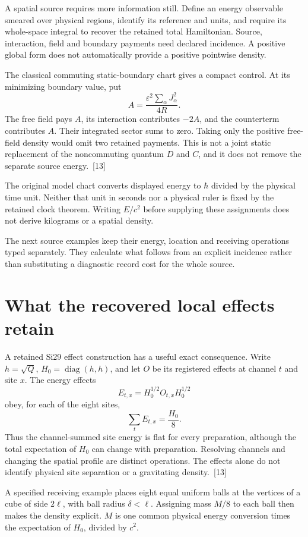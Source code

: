 \documentclass[10pt,twocolumn,letterpaper]{article}
\begin{document}
A spatial source requires more information still. Define an energy observable smeared over physical regions, identify its reference and units, and require its whole-space integral to recover the retained total Hamiltonian. Source, interaction, field and boundary payments need declared incidence. A positive global form does not automatically provide a positive pointwise density.

The classical commuting static-boundary chart gives a compact control. At its minimizing boundary value, put
\[
A=\frac{\varepsilon^2\sum_{\alpha}J_{\alpha}^2}{4R}.
\]
The free field pays $A$, its interaction contributes $-2A$, and the counterterm contributes $A$. Their integrated sector sums to zero. Taking only the positive free-field density would omit two retained payments. This is not a joint static replacement of the noncommuting quantum $D$ and $C$, and it does not remove the separate source energy.~[13]

The original model chart converts displayed energy to $\hbar$ divided by the physical time unit. Neither that unit in seconds nor a physical ruler is fixed by the retained clock theorem. Writing $E/c^2$ before supplying these assignments does not derive kilograms or a spatial density.

The next source examples keep their energy, location and receiving operations typed separately. They calculate what follows from an explicit incidence rather than substituting a diagnostic record cost for the whole source.

\section{What the recovered local effects retain}
A retained Si29 effect construction has a useful exact consequence. Write $h=\sqrt{Q}$, $H_0=\operatorname{diag}(h,h)$, and let $O$ be its registered effects at channel $t$ and site $x$. The energy effects
\[
E_{t,x}=H_0^{1/2}O_{t,x}H_0^{1/2}
\]
obey, for each of the eight sites,
\[
\sum_t E_{t,x}=\frac{H_0}{8}.
\]
Thus the channel-summed site energy is flat for every preparation, although the total expectation of $H_0$ can change with preparation. Resolving channels and changing the spatial profile are distinct operations. The effects alone do not identify physical site separation or a gravitating density.~[13]

A specified receiving example places eight equal uniform balls at the vertices of a cube of side $2\ell$, with ball radius $\delta<\ell$. Assigning mass $M/8$ to each ball then makes the density explicit. $M$ is one common physical energy conversion times the expectation of $H_0$, divided by $c^2$.
\end{document}
